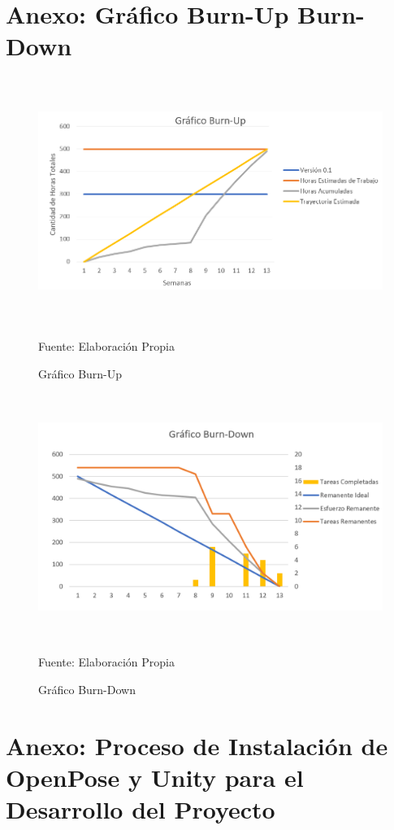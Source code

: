 \section{Anexo: Gráfico Burn-Up Burn-Down}
\begin{figure}[b!]
	\centering
	\includegraphics[width=14cm,height=8cm,]{./Images/graficoburnup.png}
	\caption{Gráfico Burn-Up}
	\footnotesize Fuente: Elaboración Propia
	\label{burnup}
\end{figure}
\begin{figure}[b!]
	\centering
	\includegraphics[width=14cm,height=8cm,]{./Images/graficoburndown.png}
	\caption{Gráfico Burn-Down}
	\footnotesize Fuente: Elaboración Propia
	\label{burndown}
\end{figure}


\newpage
\section{Anexo: Proceso de Instalación de OpenPose y Unity para el Desarrollo del Proyecto}

